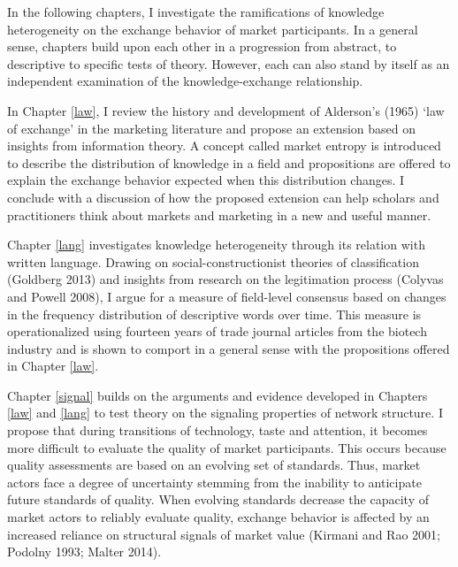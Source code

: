 In the following chapters, I investigate the ramifications of knowledge heterogeneity on the exchange behavior of market participants. In a general sense, chapters build upon each other in a progression from abstract, to descriptive to specific tests of theory. However, each can also stand by itself as an independent examination of the knowledge-exchange relationship. 

In Chapter \ref{law}, I review the history and development of Alderson's (1965) `law of exchange' in the marketing literature and propose an extension based on insights from information theory. A concept called market entropy is introduced to describe the distribution of knowledge in a field and propositions are offered to explain the exchange behavior expected when this distribution changes. I conclude with a discussion of how the proposed extension can help scholars and practitioners think about markets and marketing in a new and useful manner. 

Chapter \ref{lang} investigates knowledge heterogeneity through its relation with written language. Drawing on social-constructionist theories of classification (Goldberg 2013) and insights from research on the legitimation process (Colyvas and Powell 2008), I argue for a measure of field-level consensus based on changes in the frequency distribution of descriptive words over time. This measure is operationalized using fourteen years of trade journal articles from the biotech industry and is shown to comport in a general sense with the propositions offered in Chapter \ref{law}. 

Chapter \ref{signal} builds on the arguments and evidence developed in Chapters \ref{law} and \ref{lang} to test theory on the signaling properties of network structure. I propose that during transitions of technology, taste and attention, it becomes more difficult to evaluate the quality of market participants. This occurs because quality assessments are based on an evolving set of standards. Thus, market actors face a degree of uncertainty stemming from the inability to anticipate future standards of quality. When evolving standards decrease the capacity of market actors to reliably evaluate quality, exchange behavior is affected by an increased reliance on structural signals of market value (Kirmani and Rao 2001; Podolny 1993; Malter 2014). 

